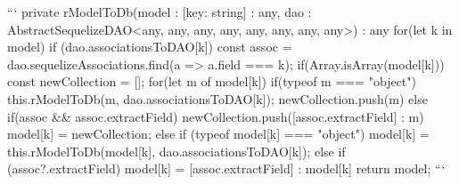             ```
            private rModelToDb(model : {[key: string] : any}, dao : AbstractSequelizeDAO<any, any, any, any, any, any, any, any>) : any {
            for(let k in model) {
                if (dao.associationsToDAO[k]) {
                    const assoc = dao.sequelizeAssociations.find(a => a.field === k);
                    if(Array.isArray(model[k])) {
                        const newCollection = [];
                        for(let m of model[k]) {
                            if(typeof m === "object") {
                                this.rModelToDb(m, dao.associationsToDAO[k]);
                                newCollection.push(m)
                            } else if(assoc && assoc.extractField) {
                                newCollection.push({[assoc.extractField] : m})
                            }
                        }
                        model[k] = newCollection;
                    } else if (typeof model[k] === "object") {
                        model[k] = this.rModelToDb(model[k], dao.associationsToDAO[k]);
                    } else if (assoc?.extractField) {
                        model[k] = {[assoc.extractField] : model[k]}
                    }
                }
            }
            return model;
        }
            ```





